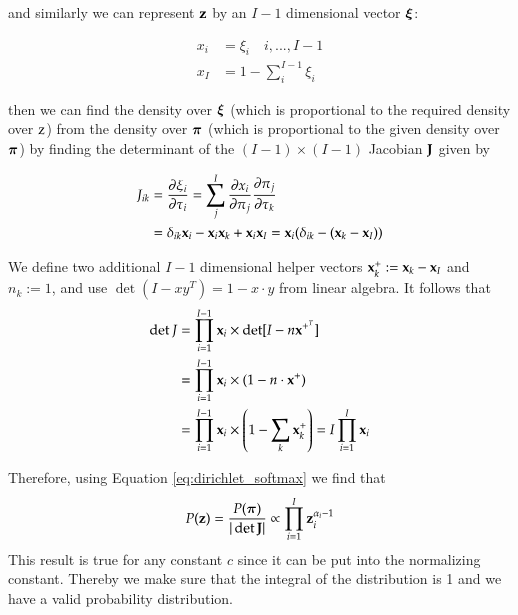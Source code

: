 and similarly we can represent $\mathbf{z}$ by an $I-1$ dimensional vector ${\boldsymbol{\xi}}$:

\begin{align}
    x_i &= \xi_i \quad i,...,I-1 \\
    x_I &= 1 - \sum_i^{I-1}\xi_i
\end{align}

then we can find the density over ${\boldsymbol{\xi}}$ (which is proportional to the required density over ${\textnormal{z}}$)
from the density over $\boldsymbol{\pi}$ (which is proportional to the given density over $\boldsymbol{\pi}$) by finding the
determinant of the $(I - 1) \times (I - 1)$ Jacobian ${\mathbf{J}}$ given by

\begin{align}
    J_{ik} &= \frac{\partial \xi_i}{\partial \tau_i} = \sum_j^{I} \frac{\partial x_i}{\partial \pi_j}\frac{\partial \pi_j}{\partial \tau_k} \nonumber\\
    &= \delta_{ik}{\mathbf{x}}_i - {\mathbf{x}}_i{\mathbf{x}}_k + {\mathbf{x}}_i{\mathbf{x}}_I =  {\mathbf{x}}_i(\delta_{ik} - ({\mathbf{x}}_k - {\mathbf{x}}_I))
\end{align}

We define two additional $I-1$ dimensional helper vectors ${\mathbf{x}}_k^+ := {\mathbf{x}}_k - {\mathbf{x}}_I$ and $n_k := 1$, and use $\det(I - xy^T) = 1 - x \cdot y$ from linear algebra. It follows that
\begin{align}
    \det J &= \prod_{i=1}^{I-1} {\mathbf{x}}_i \times \det[I-n{\mathbf{x}}^{+^T}] \nonumber \\
    &= \prod_{i=1}^{I-1} {\mathbf{x}}_i \times (1 - n \cdot {\mathbf{x}}^{+})  \\
    &= \prod_{i=1}^{I-1} {\mathbf{x}}_i \times \left(1 - \sum_k {\mathbf{x}}_k^{+} \right) = I \prod_{i=1}^I {\mathbf{x}}_i \nonumber
\end{align}

Therefore, using Equation \ref{eq:dirichlet_softmax} we find that
\begin{equation}
    P(\mathbf{z}) = \frac{P(\boldsymbol{\pi})}{|\det {\mathbf{J}}|} \propto \prod_{i=1}^{I} \mathbf{z}_i^{\alpha_i - 1} 
\end{equation}
This result is true for any constant $c$ since it can be put into the normalizing constant. Thereby we make sure that the integral of the distribution is 1 and we have a valid probability distribution.
